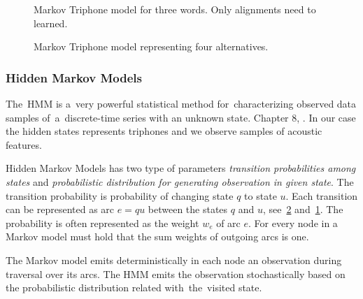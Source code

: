 {%

\begin{figure}[!htp]
    \begin{center}
    
    \caption{Markov Triphone model for three words. Only alignments need to learned.}
    \label{fig:hmm_words} 
    \end{center}
\end{figure}


\begin{figure}[!htp]
    \begin{center}
    
    \caption{Markov Triphone model representing four alternatives.}
    \label{fig:hmm_alt} 
    \end{center}
\end{figure}


%     
%     

\subsubsection*{Hidden Markov Models}
The~\ac{HMM} is a~very powerful statistical method for~characterizing observed data samples
of~a~discrete-time series with an unknown state. Chapter 8, \cite{huang2001spoken}.
In our case the hidden states represents triphones and we observe samples of  acoustic features.

Hidden Markov Models has two type of parameters {\it transition probabilities among states}\/
and {\it probabilistic distribution for generating observation in given state}.
The transition probability is probability of changing state $q$ to state $u$.
Each transition can be represented as arc $e=qu$ between the states $q$ and $u$, see~\ref{fig:hmm_alt} and~\ref{fig:hmm_words}.
The probability is often represented as the weight $w_e$ of arc $e$.
For every node in a Markov model must hold that the sum weights of outgoing arcs is one.

The Markov model emits deterministically in each node an observation during traversal over its arcs.
The \acl{HMM} emits the observation stochastically based on the probabilistic distribution related
with~the~visited state.

}

